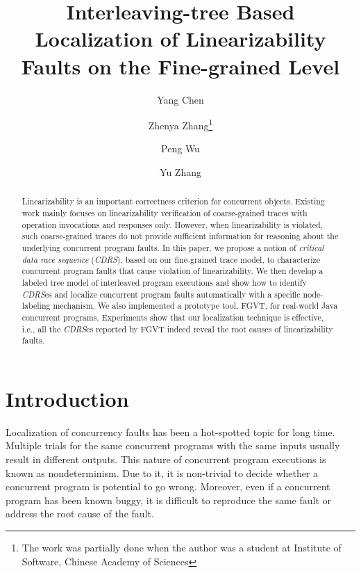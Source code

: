 \documentclass[runningheads]{llncs}
\begin{document}
%
\title{Interleaving-tree Based Localization of Linearizability Faults on the Fine-grained Level}
%
%
\author{Yang Chen \and
Zhenya Zhang\thanks{The work was partially done when the author was a student at Institute of Software, Chinese Academy of Sciences} \and
Peng Wu\and
Yu Zhang}
%
%
%
\maketitle              %
%
\begin{abstract}
Linearizability is an important correctness criterion for concurrent objects. Existing work mainly focuses on linearizability verification of coarse-grained traces with operation invocations and responses only. However, when linearizability is violated, such coarse-grained traces do not provide sufficient information for reasoning about the underlying concurrent program faults. In this paper, we propose a notion of \textit{critical data race sequence} (\textit{CDRS}), based on our fine-grained trace model, to characterize concurrent program faults that cause violation of linearizability. We then develop a labeled tree model of interleaved program executions and show how to identify \textit{CDRS}es and localize concurrent program faults automatically with a specific node-labeling mechanism. We also implemented a prototype tool, FGVT, for real-world Java concurrent programs. Experiments show that our localization technique is effective, i.e., all the \textit{CDRS}es reported by FGVT indeed reveal the root causes of linearizability faults.

\end{abstract}
%
%
%
%
%
\section{Introduction}\label{sec:introduction}
Localization of concurrency faults has been a hot-spotted topic for long time.
Multiple trials for the same concurrent programs with the same inputs usually result in different outputs.
This nature of concurrent program executions is known as nondeterminism. Due to it, 
it is non-trivial to decide whether a concurrent program is potential to go wrong.
Moreover, even if a concurrent program has been known buggy, 
it is difficult to reproduce the same fault or address the root cause of the fault.
\end{document}

